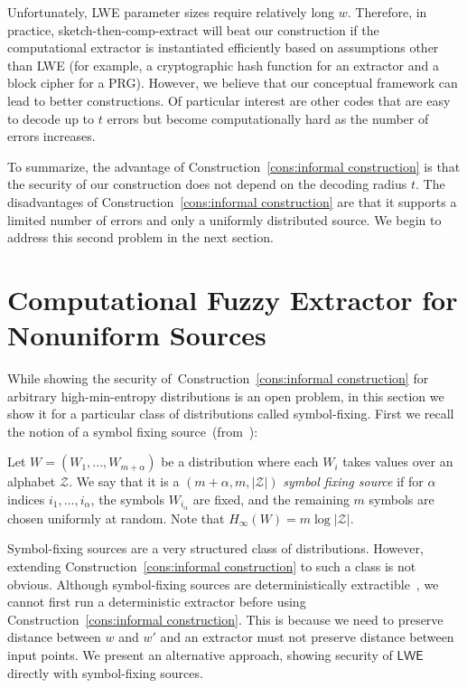 \documentclass{llncs}
\newcommand{\consref}[1]{\mbox{Construction~\ref{#1}}}
\newcommand{\class}[1]{{\ensuremath{\mathsf{#1}}}}
\newcommand{\LWE}{\class{LWE}}
\begin{document}
Unfortunately, LWE parameter sizes require relatively long $w$. Therefore, in practice, sketch-then-comp-extract will beat our construction  if the computational extractor is instantiated efficiently based on assumptions other than LWE (for example, a cryptographic hash function for an extractor and a block cipher for a PRG). However, we believe that our conceptual framework can lead to better constructions.  Of particular interest are  other codes that are easy to decode up to $t$ errors but become computationally hard as the number of errors increases.

To summarize, the advantage of \consref{cons:informal construction} is that the security of our construction does not depend on the decoding radius $t$.  
The disadvantages of \consref{cons:informal construction} are that it supports a limited number of errors and only a uniformly distributed source.  We begin to address this second problem in the next section.

\section{Computational Fuzzy Extractor for Nonuniform Sources}
\label{sec:LWE block fixing sources}
While showing the security of~\consref{cons:informal construction} for arbitrary high-min-entropy distributions is an open problem, in this section we show it for a particular class of distributions called symbol-fixing.   First we recall the notion of a symbol fixing source~(from~\cite[Definition 2.3]{KZ07}): 
\begin{definition}
Let $W = (W_1,..., W_{m+\alpha})$ be a distribution where each $W_i$ takes values over an alphabet $\mathcal{Z}$.  We say that it is a $(m+
\alpha, m, |\mathcal{Z}|) $ \emph{symbol fixing source} if for $\alpha$ indices $i_1, \dots, i_\alpha$, the symbols $W_{i_\alpha}$ are fixed, and the remaining $m$  symbols are chosen uniformly at random.  Note that $H_\infty(W)=m\log |\mathcal{Z}|$.
\end{definition}

Symbol-fixing sources are a very structured class of distributions.  However, extending \consref{cons:informal construction} to such a class is not obvious.  Although symbol-fixing sources are deterministically extractible~\cite{KZ07}, we cannot first run a deterministic extractor before using \consref{cons:informal construction}.  This is because we need to preserve distance between $w$ and $w'$ and an extractor must not preserve distance between input points.  We present an alternative approach, showing security of $\LWE$ directly with symbol-fixing sources.
\end{document}
